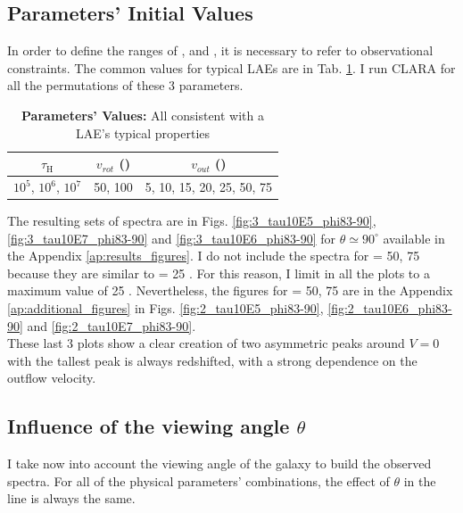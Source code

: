 \documentclass[twocolappendix]{latex/emulateapj}
\begin{document}
\subsection{Parameters' Initial Values}

In order to define the ranges of \tauh, \vrot and \vout, it is necessary to refer to observational constraints. The common values for typical LAEs are in Tab. \ref{tab:values}. I run CLARA for all the permutations of these 3 parameters. \\

\begin{table}[htbp]
	\centering
	\begin{tabular}{|c|c|c|}
		\hline
		$\tau_{\mathrm{H}}$ & $v_{rot}$ (\kms) & $v_{out}$ (\kms) \\
		\hline
		$10^5$, $10^6$, $10^7$ & 50, 100 & 5, 10, 15, 20, 25, 50, 75 \\
		\hline
	\end{tabular}
	\caption{\textbf{Parameters' Values:} All consistent with a LAE's typical properties}
	\label{tab:values}
\end{table}

The resulting sets of spectra are in Figs. \ref{fig:3_tau10E5_phi83-90}, \ref{fig:3_tau10E7_phi83-90} and \ref{fig:3_tau10E6_phi83-90} for $\theta \simeq 90^\circ$ available in the Appendix \ref{ap:results_figures}. I do not include the spectra for \vout = 50, 75 \kms because they are similar to \vout = 25 \kms. For this reason, I limit in all the plots \vout to a maximum value of 25 \kms. Nevertheless, the figures for \vout = 50, 75 \kms are in the Appendix \ref{ap:additional_figures} in Figs. \ref{fig:2_tau10E5_phi83-90}, \ref{fig:2_tau10E6_phi83-90} and \ref{fig:2_tau10E7_phi83-90}.\\

These last 3 plots show a clear creation of two asymmetric peaks around $V=0$ \kms with the tallest peak is always redshifted, with a strong dependence on the outflow velocity.\\

\subsection{Influence of the viewing angle $\theta$}
I take now into account the viewing angle of the galaxy to build the observed spectra. For all of the physical parameters' combinations, the effect of $\theta$ in the \lya line is always the same.\\
\end{document}
